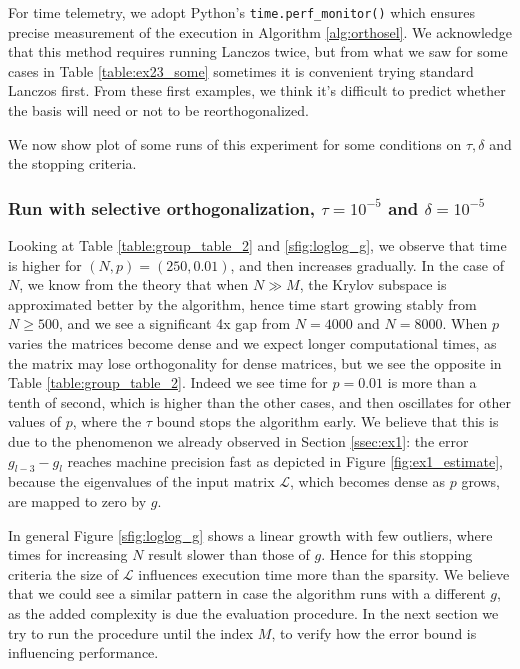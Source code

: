 \documentclass[11pt]{article}
\renewcommand{\L}{\mathcal{L}}
\theoremstyle{definition}
\theoremstyle{remark}
\theoremstyle{experimental}
\begin{document}
For time telemetry, we adopt Python's \texttt{time.perf\_monitor()} which ensures precise
measurement of the execution in Algorithm \ref{alg:orthosel}. We acknowledge that this method
requires running Lanczos twice, but from what we saw for some cases in Table
\ref{table:ex23_some} sometimes it is convenient trying standard Lanczos first. From these first examples, we think it's difficult to predict whether the basis will need or not to be reorthogonalized.

We now show plot of some runs of this experiment for some conditions on $ \tau, \delta $ and the stopping
criteria.
\subsubsection{Run with selective orthogonalization, $ \tau =  10^{-5}$ and $
\delta = 10^{-5}$}

Looking at Table \ref{table:group_table_2} and \ref{sfig:loglog_g}, we observe that time is higher
for $ (N, p) = (250,0.01) $, and then increases
gradually. In the case of $ N $, we know from the theory that when $ N \gg M $, the Krylov subspace
is approximated better by the algorithm, hence time start growing stably from $ N \ge 500 $, and we
see a significant 4x gap from $ N = 4000 $ and $ N = 8000 $.
When $ p $ varies the matrices become dense and we expect longer computational times, as the matrix
may lose orthogonality for dense matrices, but we see the opposite in Table
\ref{table:group_table_2}. Indeed we see time for $ p = 0.01$ is more than a 
tenth of second, which is higher than the other cases, and then oscillates for other values of $ p $,
where the $ \tau $ bound stops the algorithm early. We believe that this is due to the phenomenon we already observed in Section \ref{ssec:ex1}: the error $ g_{l-3} - g_l $ reaches machine
precision fast as depicted in Figure \ref{fig:ex1_estimate}, because the eigenvalues of the input
matrix $ \L $, which becomes dense as $ p $ grows, are mapped to zero by $ g $.

In general Figure \ref{sfig:loglog_g} shows a linear growth with few outliers, where times for
increasing $ N $ result slower than those of $ g $. Hence for this stopping criteria the size of $
\L $ influences execution time more than the sparsity. We believe that we could see a similar
pattern in case the algorithm runs with a different $ g $, as the added complexity is due the
evaluation procedure. In the next section we try to run
the procedure until the index $ M $, to verify how the error bound is influencing performance.
\end{document}
